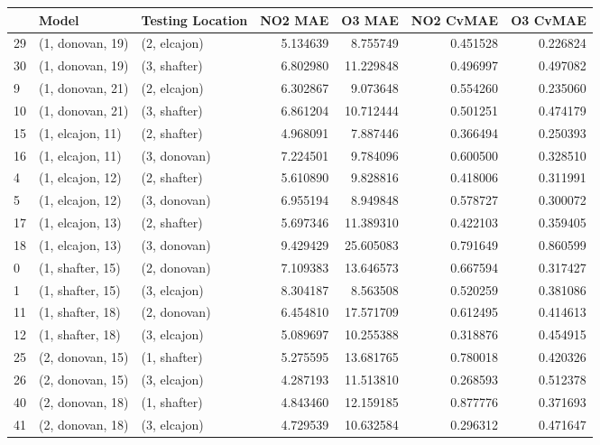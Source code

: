 \begin{tabular}{lllrrrr}
\toprule
{} &             Model & Testing Location &   NO2 MAE &     O3 MAE &  NO2 CvMAE &  O3 CvMAE \\
\midrule
29 &  (1, donovan, 19) &     (2, elcajon) &  5.134639 &   8.755749 &   0.451528 &  0.226824 \\
30 &  (1, donovan, 19) &     (3, shafter) &  6.802980 &  11.229848 &   0.496997 &  0.497082 \\
9  &  (1, donovan, 21) &     (2, elcajon) &  6.302867 &   9.073648 &   0.554260 &  0.235060 \\
10 &  (1, donovan, 21) &     (3, shafter) &  6.861204 &  10.712444 &   0.501251 &  0.474179 \\
15 &  (1, elcajon, 11) &     (2, shafter) &  4.968091 &   7.887446 &   0.366494 &  0.250393 \\
16 &  (1, elcajon, 11) &     (3, donovan) &  7.224501 &   9.784096 &   0.600500 &  0.328510 \\
4  &  (1, elcajon, 12) &     (2, shafter) &  5.610890 &   9.828816 &   0.418006 &  0.311991 \\
5  &  (1, elcajon, 12) &     (3, donovan) &  6.955194 &   8.949848 &   0.578727 &  0.300072 \\
17 &  (1, elcajon, 13) &     (2, shafter) &  5.697346 &  11.389310 &   0.422103 &  0.359405 \\
18 &  (1, elcajon, 13) &     (3, donovan) &  9.429429 &  25.605083 &   0.791649 &  0.860599 \\
0  &  (1, shafter, 15) &     (2, donovan) &  7.109383 &  13.646573 &   0.667594 &  0.317427 \\
1  &  (1, shafter, 15) &     (3, elcajon) &  8.304187 &   8.563508 &   0.520259 &  0.381086 \\
11 &  (1, shafter, 18) &     (2, donovan) &  6.454810 &  17.571709 &   0.612495 &  0.414613 \\
12 &  (1, shafter, 18) &     (3, elcajon) &  5.089697 &  10.255388 &   0.318876 &  0.454915 \\
25 &  (2, donovan, 15) &     (1, shafter) &  5.275595 &  13.681765 &   0.780018 &  0.420326 \\
26 &  (2, donovan, 15) &     (3, elcajon) &  4.287193 &  11.513810 &   0.268593 &  0.512378 \\
40 &  (2, donovan, 18) &     (1, shafter) &  4.843460 &  12.159185 &   0.877776 &  0.371693 \\
41 &  (2, donovan, 18) &     (3, elcajon) &  4.729539 &  10.632584 &   0.296312 &  0.471647 \\

\end{tabular}
